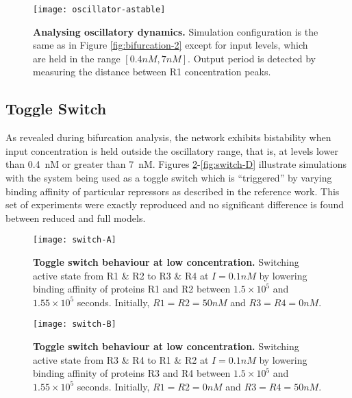     \begin{figure}[!htb]
      \centering
      \texttt{[image: oscillator-astable]}
      \caption{\textbf{Analysing oscillatory dynamics.} Simulation configuration is the same as in Figure \ref{fig:bifurcation-2} except for input levels, which are held in the range $[0.4 nM, 7 nM]$. Output period is detected by measuring the distance between R1 concentration peaks.}
      \label{fig:oscillator-astable}
    \end{figure}


  \subsection{Toggle Switch}

    As revealed during bifurcation analysis, the network exhibits bistability when input concentration is held outside the oscillatory range, that is, at levels lower than \SI{0.4}{\nano M} or greater than \SI{7}{\nano M}.
    Figures \ref{fig:switch-A}-\ref{fig:switch-D} illustrate simulations with the system being used as a toggle switch which is ``triggered'' by varying binding affinity of particular repressors as described in the reference work.
    This set of experiments were exactly reproduced and no significant difference is found between reduced and full models.


    \begin{figure}[!htb]
      \centering
      \texttt{[image: switch-A]}
      \caption{\textbf{Toggle switch behaviour at low concentration.} Switching active state from R1 \& R2 to R3 \& R4 at $I = 0.1 nM$ by lowering binding affinity of proteins R1 and R2 between $1.5 \times 10^5$ and $1.55 \times 10^5$ seconds. Initially, $R1 = R2 = 50nM$ and $R3 = R4 = 0nM$.}
      \label{fig:switch-A}
    \end{figure}
    \begin{figure}[!htb]
      \centering
      \texttt{[image: switch-B]}
      \caption{\textbf{Toggle switch behaviour at low concentration.} Switching active state from R3 \& R4 to R1 \& R2 at $I = 0.1 nM$ by lowering binding affinity of proteins R3 and R4 between $1.5 \times 10^5$ and $1.55 \times 10^5$ seconds. Initially, $R1 = R2 = 0nM$ and $R3 = R4 = 50nM$.}
      \label{fig:switch-B}
    \end{figure}


